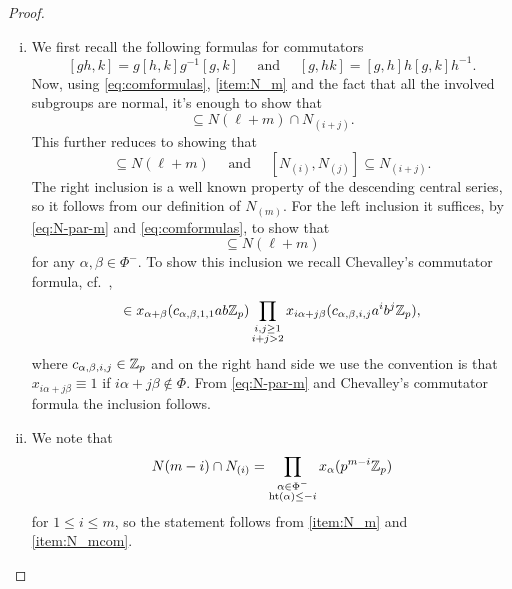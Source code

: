 \begin{proof}
\begin{enumerate}[(i),wide]
  \item We first recall the following formulas for commutators
    \begin{equation}\label{eq:comformulas}
      [gh,k] = g[h,k]g^{-1}[g,k] \quad \text{ and } \quad [g,hk] = [g,h]h[g,k]h^{-1}.
    \end{equation}
    Now, using \eqref{eq:comformulas}, \ref{item:N_m} and the fact that all the involved subgroups are normal, it's enough to show that
    \begin{equation*}
      [N(\ell) \cap N_{(i)}, N(m) \cap N_{(j)}] \subseteq N(\ell+m) \cap N_{(i+j)}.
    \end{equation*}
    This further reduces to showing that
    \begin{equation*}
      [N(\ell),N(m)] \subseteq N(\ell+m) \quad \text{ and } \quad [N_{(i)},N_{(j)}] \subseteq N_{(i+j)}.
    \end{equation*}
    The right inclusion is a well known property of the descending central series, so it follows from our definition of $N_{(m)}$. For the left inclusion it suffices, by \eqref{eq:N-par-m} and \eqref{eq:comformulas}, to show that
    \begin{equation*}
      [x_\alpha(p^\ell \Z_p), x_\beta(p^m \Z_p)] \subseteq N(\ell + m)
    \end{equation*}
    for any $\alpha,\beta \in \Phi^{-}$. To show this inclusion we recall Chevalley's commutator formula, cf.\ \cite[Prop.~5.1.14]{Con-book},
    \begin{equation*}
      [x_\alpha(a),x_\beta(b)] \in x_{\alpha+\beta}(c_{\alpha,\beta,1,1}ab\Z_p) \prod_{\substack{i,j \geq 1 \\ i+j > 2}} x_{i\alpha + j\beta}(c_{\alpha,\beta,i,j}a^{i}b^{j}\Z_p),
    \end{equation*}
    where $c_{\alpha,\beta,i,j} \in \mathbb{Z}_{p}$ and on the right hand side we use the convention is that $x_{i\alpha + j\beta} \equiv 1$ if $i\alpha + j\beta \notin \Phi$. From \eqref{eq:N-par-m} and Chevalley's commutator formula the inclusion follows.

  \item We note that
    \begin{equation*}
      N(m-i) \cap N_{(i)} = \prod_{\substack{\alpha \in \Phi^{-} \\ \operatorname{ht}(\alpha) \leq -i}} x_\alpha(p^{m-i} \mathbb{Z}_p)
    \end{equation*}
    for $1 \leq i \leq m$, so the statement follows from \ref{item:N_m} and \ref{item:N_mcom}.


\end{enumerate}
\end{proof}
